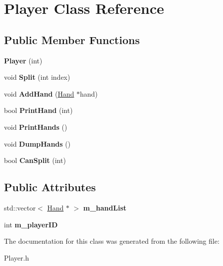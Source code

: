 \hypertarget{class_player}{}\section{Player Class Reference}
\label{class_player}
\subsection*{Public Member Functions}
\begin{DoxyCompactItemize}
\item 
{\bfseries Player} (int)\hypertarget{class_player_abc43d94bb41c9791d10acf5b2c3fc09b}{}\label{class_player_abc43d94bb41c9791d10acf5b2c3fc09b}

\item 
void {\bfseries Split} (int index)\hypertarget{class_player_a3a627672714563333c44d83faf8a2696}{}\label{class_player_a3a627672714563333c44d83faf8a2696}

\item 
void {\bfseries Add\+Hand} (\hyperlink{class_hand}{Hand} $\ast$hand)\hypertarget{class_player_add15dd07cc4772d4509a49e31b04556b}{}\label{class_player_add15dd07cc4772d4509a49e31b04556b}

\item 
bool {\bfseries Print\+Hand} (int)\hypertarget{class_player_a2142881dd58bd5ac7a7ec75b958069e1}{}\label{class_player_a2142881dd58bd5ac7a7ec75b958069e1}

\item 
void {\bfseries Print\+Hands} ()\hypertarget{class_player_a31326f0143919f9d2412bf094f571a95}{}\label{class_player_a31326f0143919f9d2412bf094f571a95}

\item 
void {\bfseries Dump\+Hands} ()\hypertarget{class_player_a2b8128800c27146c8ecebbbf2d1f4ffa}{}\label{class_player_a2b8128800c27146c8ecebbbf2d1f4ffa}

\item 
bool {\bfseries Can\+Split} (int)\hypertarget{class_player_a228554349109ae4e44ee40209796bb16}{}\label{class_player_a228554349109ae4e44ee40209796bb16}

\end{DoxyCompactItemize}
\subsection*{Public Attributes}
\begin{DoxyCompactItemize}
\item 
std\+::vector$<$ \hyperlink{class_hand}{Hand} $\ast$ $>$ {\bfseries m\+\_\+hand\+List}\hypertarget{class_player_ac4ef2a880d80f353a4a96391516d5629}{}\label{class_player_ac4ef2a880d80f353a4a96391516d5629}

\item 
int {\bfseries m\+\_\+player\+ID}\hypertarget{class_player_a82caa9879f5233e641dda10a41d9186f}{}\label{class_player_a82caa9879f5233e641dda10a41d9186f}

\end{DoxyCompactItemize}


The documentation for this class was generated from the following file\+:\begin{DoxyCompactItemize}
\item 
Player.\+h\end{DoxyCompactItemize}
